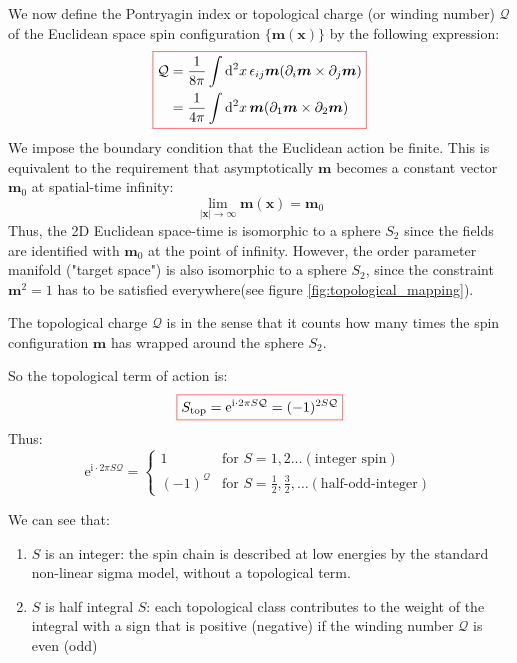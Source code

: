 We now define the Pontryagin index or topological charge (or winding number) $\mathcal{Q}$ 
of the Euclidean space spin configuration $\{\bm{m}(\bm{x})\}$ by the following expression:
\begin{equation}
    \colorboxed{
    \begin{aligned}
    \mathcal{Q} &= \frac{1}{8\pi} \int \mathrm{d}^2x \, \epsilon_{ij} \bm{m} (\partial_i \bm{m} \times \partial_j \bm{m}) \\
    &= \frac{1}{4\pi} \int \mathrm{d}^2x \, \bm{m} (\partial_1 \bm{m} \times \partial_2 \bm{m})
    \end{aligned}
    }
\end{equation}
We impose the boundary condition that the Euclidean action be finite. This is equivalent to the requirement that asymptotically $\bm{m}$ becomes a constant vector $\bm{m}_0$ at spatial-time infinity:
\begin{equation}
\lim_{|\bm{x}|\to\infty} \bm{m}(\bm{x}) = \bm{m}_0
\end{equation}
Thus, the 2D Euclidean space-time is isomorphic to a sphere $S_2$ since the fields are identified with $\bm{m}_0$ at the point of infinity.
However, the order parameter manifold ("target space") is also isomorphic to a sphere $S_2$, 
since the constraint $\bm{m}^2=1$ has to be satisfied everywhere(see figure \ref{fig:topological_mapping}).



The topological charge $\mathcal{Q}$ is in the sense that it counts how many times the spin configuration $\bm{m}$ has wrapped around the sphere $S_2$.

So the topological term of action is:
\begin{equation}
    \colorboxed{
    S_{\text{top}} = \mathrm{e}^{\mathrm{i} \cdot 2\pi S \mathcal{Q}} = (-1)^{2S\mathcal{Q}}
    }
\end{equation}
Thus:
\begin{equation}
\mathrm{e}^{\mathrm{i} \cdot 2\pi S \mathcal{Q}} = \begin{cases}
1 & \text{for } S=1,2 \dots (\text{integer spin}) \\
(-1)^{\mathcal{Q}} & \text{for } S=\frac{1}{2}, \frac{3}{2}, \dots (\text{half-odd-integer})
\end{cases}
\end{equation}

We can see that:
\begin{enumerate}[(1)]
    \item $S$ is an integer: the spin chain is described at low energies by the standard non-linear sigma model, without a topological term.
    \item $S$ is half integral $S$: each topological class contributes to the weight of the integral with a sign that is positive (negative) if the winding number $\mathcal{Q}$ is even (odd)
\end{enumerate}

